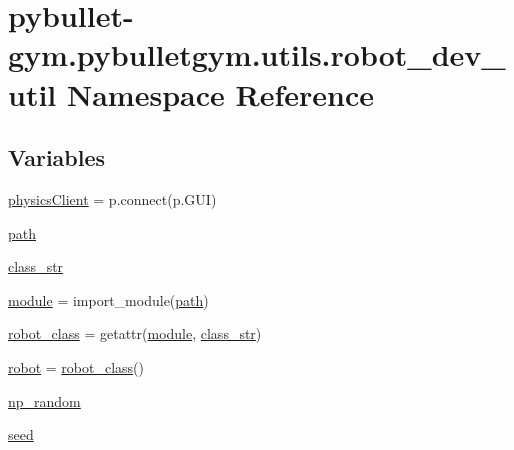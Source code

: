 \hypertarget{namespacepybullet-gym_1_1pybulletgym_1_1utils_1_1robot__dev__util}{}\section{pybullet-\/gym.pybulletgym.\+utils.\+robot\+\_\+dev\+\_\+util Namespace Reference}
\label{namespacepybullet-gym_1_1pybulletgym_1_1utils_1_1robot__dev__util}
\subsection*{Variables}
\begin{DoxyCompactItemize}
\item 
\hyperlink{namespacepybullet-gym_1_1pybulletgym_1_1utils_1_1robot__dev__util_a9104a9f8c2f517c64bb0ccf159afcb1c}{physics\+Client} = p.\+connect(p.\+G\+UI)
\item 
\hyperlink{namespacepybullet-gym_1_1pybulletgym_1_1utils_1_1robot__dev__util_adcf35697ccadf39be44c1dc0d35db762}{path}
\item 
\hyperlink{namespacepybullet-gym_1_1pybulletgym_1_1utils_1_1robot__dev__util_a3643d0d4cb33349d74ca22a1a3af0f57}{class\+\_\+str}
\item 
\hyperlink{namespacepybullet-gym_1_1pybulletgym_1_1utils_1_1robot__dev__util_a8fc21e4d6ab7e4328506d298c36aed79}{module} = import\+\_\+module(\hyperlink{namespacepybullet-gym_1_1pybulletgym_1_1utils_1_1robot__dev__util_adcf35697ccadf39be44c1dc0d35db762}{path})
\item 
\hyperlink{namespacepybullet-gym_1_1pybulletgym_1_1utils_1_1robot__dev__util_ab9e018625f4d8796004d19a7a7fecb08}{robot\+\_\+class} = getattr(\hyperlink{namespacepybullet-gym_1_1pybulletgym_1_1utils_1_1robot__dev__util_a8fc21e4d6ab7e4328506d298c36aed79}{module}, \hyperlink{namespacepybullet-gym_1_1pybulletgym_1_1utils_1_1robot__dev__util_a3643d0d4cb33349d74ca22a1a3af0f57}{class\+\_\+str})
\item 
\hyperlink{namespacepybullet-gym_1_1pybulletgym_1_1utils_1_1robot__dev__util_a39140f37b46728d9efd0217db94d6a5e}{robot} = \hyperlink{namespacepybullet-gym_1_1pybulletgym_1_1utils_1_1robot__dev__util_ab9e018625f4d8796004d19a7a7fecb08}{robot\+\_\+class}()
\item 
\hyperlink{namespacepybullet-gym_1_1pybulletgym_1_1utils_1_1robot__dev__util_ad98ff876e260513f10ad4be2e445071f}{np\+\_\+random}
\item 
\hyperlink{namespacepybullet-gym_1_1pybulletgym_1_1utils_1_1robot__dev__util_af709228c260681b4e4272756e4a263f5}{seed}
\end{DoxyCompactItemize}


